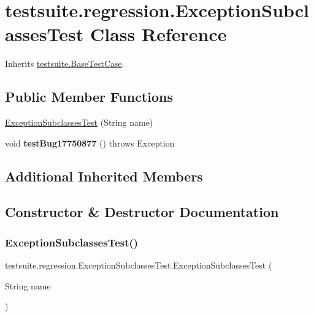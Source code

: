 \hypertarget{classtestsuite_1_1regression_1_1_exception_subclasses_test}{}\section{testsuite.\+regression.\+Exception\+Subclasses\+Test Class Reference}
\label{classtestsuite_1_1regression_1_1_exception_subclasses_test}


Inherits \mbox{\hyperlink{classtestsuite_1_1_base_test_case}{testsuite.\+Base\+Test\+Case}}.

\subsection*{Public Member Functions}
\begin{DoxyCompactItemize}
\item 
\mbox{\hyperlink{classtestsuite_1_1regression_1_1_exception_subclasses_test_a028745d5ed391f13e14f8238066ee2d8}{Exception\+Subclasses\+Test}} (String name)
\item 
\mbox{\label{classtestsuite_1_1regression_1_1_exception_subclasses_test_a2eb17ba3714d3c08bb6403410dc77880}} 
void {\bfseries test\+Bug17750877} ()  throws Exception 
\end{DoxyCompactItemize}
\subsection*{Additional Inherited Members}


\subsection{Constructor \& Destructor Documentation}
\mbox{\label{classtestsuite_1_1regression_1_1_exception_subclasses_test_a028745d5ed391f13e14f8238066ee2d8}} 
\subsubsection{\texorpdfstring{Exception\+Subclasses\+Test()}{ExceptionSubclassesTest()}}
{\footnotesize\ttfamily testsuite.\+regression.\+Exception\+Subclasses\+Test.\+Exception\+Subclasses\+Test (\begin{DoxyParamCaption}\item[{String}]{name }\end{DoxyParamCaption})}

